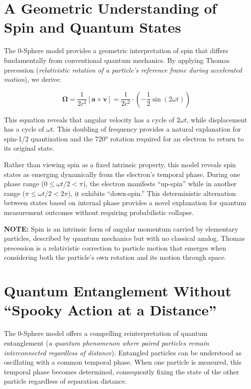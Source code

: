 \documentclass[12pt,letterpaper]{article} %
\begin{document}
\section{A Geometric Understanding of Spin and Quantum States}

The 0-Sphere model provides a geometric interpretation of spin that differs fundamentally from conventional quantum mechanics. By applying Thomas precession (\textit{relativistic rotation of a particle's reference frame during accelerated motion})\cite{thomas1926, thomas1927}, we derive:

\begin{equation}
\boldsymbol{\Omega} = \frac{1}{2c^2}[\boldsymbol{a} \times \boldsymbol{v}] = \frac{1}{2c^2} \cdot \left(-\frac{1}{2}\sin(2\omega t)\right)
\end{equation}

This equation reveals that angular velocity has a cycle of $2\omega t$, while displacement has a cycle of $\omega t$. This doubling of frequency provides a natural explanation for spin-1/2 quantization and the 720° rotation required for an electron to return to its original state\cite{hanamura2023}.

Rather than viewing spin as a fixed intrinsic property, this model reveals spin states as emerging dynamically from the electron's temporal phase. During one phase range ($0 \leq \omega t/2 < \pi$), the electron manifests ``up-spin'' while in another range ($\pi \leq \omega t/2 < 2\pi$), it exhibits ``down-spin.'' This deterministic alternation between states based on internal phase provides a novel explanation for quantum measurement outcomes without requiring probabilistic collapse\cite{weinberg1995}.

\vspace{0.5cm}
\noindent\textbf{NOTE:} Spin is an intrinsic form of angular momentum carried by elementary particles, described by quantum mechanics but with no classical analog. Thomas precession is a relativistic correction to particle motion that emerges when considering both the particle's own rotation and its motion through space.





\section{Quantum Entanglement Without ``Spooky Action at a Distance''}

The 0-Sphere model offers a compelling reinterpretation of quantum entanglement (\textit{a quantum phenomenon where paired particles remain interconnected regardless of distance}). Entangled particles can be understood as oscillating with a common temporal phase. When one particle is measured, this temporal phase becomes determined, consequently fixing the state of the other particle regardless of separation distance\cite{einstein1935}.
\end{document}

